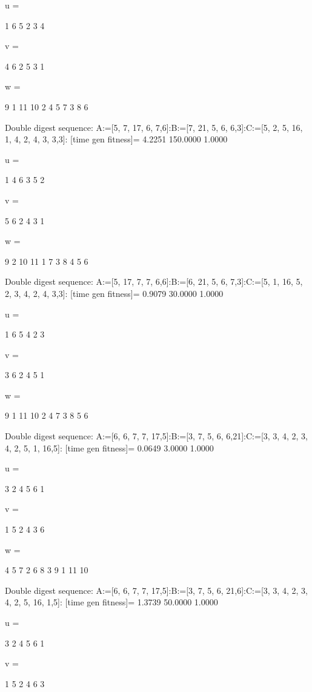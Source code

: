 u =

     1     6     5     2     3     4


v =

     4     6     2     5     3     1


w =

     9     1    11    10     2     4     5     7     3     8     6

Double digest sequence:
A:=[5, 7, 17, 6, 7,6]:B:=[7, 21, 5, 6, 6,3]:C:=[5, 2, 5, 16, 1, 4, 2, 4, 3, 3,3]:
[time gen fitness]=
    4.2251  150.0000    1.0000


u =

     1     4     6     3     5     2


v =

     5     6     2     4     3     1


w =

     9     2    10    11     1     7     3     8     4     5     6

Double digest sequence:
A:=[5, 17, 7, 7, 6,6]:B:=[6, 21, 5, 6, 7,3]:C:=[5, 1, 16, 5, 2, 3, 4, 2, 4, 3,3]:
[time gen fitness]=
    0.9079   30.0000    1.0000


u =

     1     6     5     4     2     3


v =

     3     6     2     4     5     1


w =

     9     1    11    10     2     4     7     3     8     5     6

Double digest sequence:
A:=[6, 6, 7, 7, 17,5]:B:=[3, 7, 5, 6, 6,21]:C:=[3, 3, 4, 2, 3, 4, 2, 5, 1, 16,5]:
[time gen fitness]=
    0.0649    3.0000    1.0000


u =

     3     2     4     5     6     1


v =

     1     5     2     4     3     6


w =

     4     5     7     2     6     8     3     9     1    11    10

Double digest sequence:
A:=[6, 6, 7, 7, 17,5]:B:=[3, 7, 5, 6, 21,6]:C:=[3, 3, 4, 2, 3, 4, 2, 5, 16, 1,5]:
[time gen fitness]=
    1.3739   50.0000    1.0000


u =

     3     2     4     5     6     1


v =

     1     5     2     4     6     3


